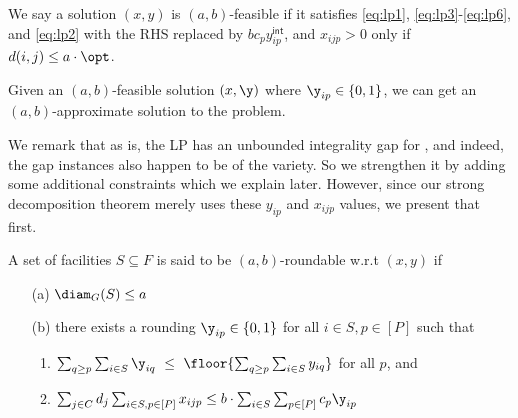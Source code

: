 \noindent		
We say a solution $(x,y)$ is $(a,b)$-feasible if it satisfies \eqref{eq:lp1}, \eqref{eq:lp3}-\eqref{eq:lp6}, and \eqref{eq:lp2} with the RHS replaced by $bc_py^\mathsf{int}_{ip}$, and $x_{ijp} > 0$ only if $d(i,j) \leq a\cdot \opt$.
\begin{claim}
Given an $(a,b)$-feasible solution $(x,\y)$ where $\y_{ip}\in \{0,1\}$,
we can get  an $(a,b)$-approximate solution to the \mckc problem.
\end{claim}
\iffalse
\begin{proof}
Consider a bipartite graph with client nodes $C$ on one side, and nodes of the form $(i,p)$ with $\y_{ip} = 1$ on the other. The node $(i,p)$ has capacity $bc_p$.
Since $(x,\y)$ satisfies the conditions of the lemma, there is a fractional matching in this graph so that each client $j$  is fractionally matched to an $(i,p)$ so that $d(i,j)\leq a\cdot \opt$,
and the total fractional load on $(i,p)$ is $\leq bc_p$. The theory of matching tells us that there is an {\em integral} assignment of clients $j$ to nodes $(i,p)$ such that $d(i,j)\leq a\cdot\opt$
and the number of nodes matched to $(i,p)$ is $\leq \ceil{bc_p}$. Therefore opening a capacity $c_p$ facility at $i$ for all $(i,p)$ with $\y_{ip} = 1$ gives an $(a,b)$-approximate solution to \mckc.
\end{proof}
\fi

We remark that as is, the LP has an unbounded integrality gap for \mckc, and indeed, the gap instances also happen to be of the \cckp variety. So we strengthen it by adding some additional constraints which we explain later. However, since our strong decomposition theorem merely uses these $y_{ip}$ and $x_{ijp}$ values, we present that first. %
\begin{definition}\label{def:rnding-mkc}
	A set of facilities $S\subseteq F$ is said to be $(a,b)$-roundable w.r.t $(x,y)$ if
	\begin{itemize}[noitemsep]
		\item[(a)] $\diam_G(S) \leq a$
		\item[(b)] there exists a rounding $\y_{ip} \in \{0,1\}$ for all $i \in S, p\in [P]$ such that
		\begin{enumerate}
			\item $\sum_{q \geq p} \sum_{i\in S} \y_{iq} ~\leq~ \floor{\sum_{q \geq p}\sum_{i\in S} y_{iq}}$ for all $p$, and
			\item $\sum_{j\in C} d_j \sum_{i\in S,p\in [P]} x_{ijp} \leq b\cdot \sum_{i\in S} \sum_{p\in [P]} c_p \y_{ip}$
		\end{enumerate}
	\end{itemize}
\end{definition}
\noindent

